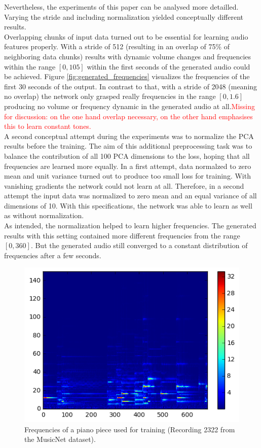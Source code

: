 \documentclass[10pt,conference,compsocconf]{IEEEtran}
\begin{document}
Nevertheless, the experiments of this paper can be analysed more detailled. Varying the stride and including normalization yielded conceptually different results.\\
Overlapping chunks of input data turned out to be essential for learning audio features properly. With a stride of 512 (resulting in an overlap of 75\% of neighboring data chunks) results with dynamic volume changes and frequencies within the range $[0, 105]$ within the first seconds of the generated audio could be achieved. Figure \ref{fig:generated_frequencies} visualizes the frequencies of the first 30 seconds of the output. In contrast to that, with a stride of 2048 (meaning no overlap) the network only grasped really frequencies in the range $[0,1.6]$ producing no volume or frequency dynamic in the generated audio at all.\textcolor{red}{Missing for discussion: on the one hand overlap necessary, on the other hand emphasises this to learn constant tones.}\\
A second conceptual attempt during the experiments was to normalize the PCA results before the training. The aim of this additional preprocessing task was to balance the contribution of all 100 PCA dimensions to the loss, hoping that all frequencies are learned more equally. In a first attempt, data normalzed to zero mean and unit variance turned out to produce too small loss for training. With vanishing gradients the network could not learn at all. Therefore, in a second attempt the input data was normalized to zero mean and an equal variance of all dimensions of 10. With this specifications, the network was able to learn as well as without normalization.\\
As intended, the normalization helped to learn higher frequencies. The generated results with this setting contained more different frequencies from the range $[0,360]$. But the generated audio still converged to a constant distribution of frequencies after a few seconds. 
\begin{figure}[tbp]
  \centering
  \includegraphics[width=\columnwidth]{figures/original_frequencies.png}
  \caption{Frequencies of a piano piece used for training (Recording 2322 from the MusicNet dataset). }
  \label{fig:original_frequencies}
\end{figure}
\end{document}
